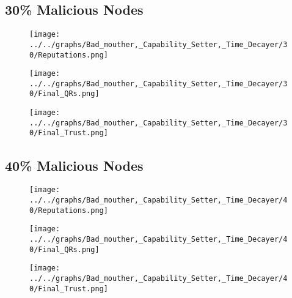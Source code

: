 \begin{minipage}[t]{0.49\columnwidth}
\subsection*{30\% Malicious Nodes}
    \begin{figure}[H]
        \centering
        \texttt{[image: ../../graphs/Bad\_mouther,\_Capability\_Setter,\_Time\_Decayer/30/Reputations.png]}
    \end{figure}
    \begin{figure}[H]
        \centering
        \texttt{[image: ../../graphs/Bad\_mouther,\_Capability\_Setter,\_Time\_Decayer/30/Final\_QRs.png]}
    \end{figure}
\end{minipage}
\begin{minipage}[t]{0.49\columnwidth}
    \begin{figure}[H]
        \centering
        \texttt{[image: ../../graphs/Bad\_mouther,\_Capability\_Setter,\_Time\_Decayer/30/Final\_Trust.png]}
    \end{figure}
\end{minipage}

\begin{minipage}[t]{0.49\columnwidth}
\subsection*{40\% Malicious Nodes}
    \begin{figure}[H]
        \centering
        \texttt{[image: ../../graphs/Bad\_mouther,\_Capability\_Setter,\_Time\_Decayer/40/Reputations.png]}
    \end{figure}
    \begin{figure}[H]
        \centering
        \texttt{[image: ../../graphs/Bad\_mouther,\_Capability\_Setter,\_Time\_Decayer/40/Final\_QRs.png]}
    \end{figure}
\end{minipage}
\begin{minipage}[t]{0.49\columnwidth}
    \begin{figure}[H]
        \centering
        \texttt{[image: ../../graphs/Bad\_mouther,\_Capability\_Setter,\_Time\_Decayer/40/Final\_Trust.png]}
    \end{figure}
\end{minipage}

